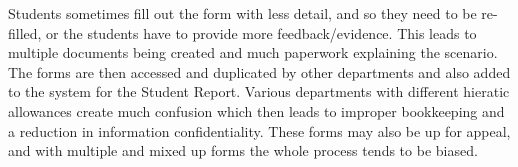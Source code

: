 \documentclass[../main.tex]{subfiles}
\begin{document}
\raggedright
Students sometimes fill out the form with less detail, and so they need to be re-filled, or the students have to provide more feedback/evidence. This leads to multiple documents being created and much paperwork explaining the scenario. The forms are then accessed and duplicated by other departments and also added to the system for the Student Report. Various departments with different hieratic allowances create much confusion which then leads to improper bookkeeping and a reduction in information confidentiality. These forms may also be up for appeal, and with multiple and mixed up forms the whole process tends to be biased. 
\end{document}
